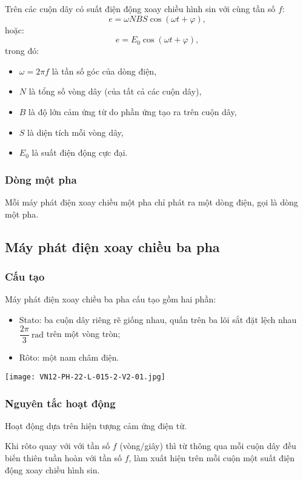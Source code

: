 Trên các cuộn dây có suất điện động xoay chiều hình sin với cùng tần số $f$:
\begin{equation*}
	e=\omega NBS\cos(\omega t +\varphi),
\end{equation*}
hoặc:
\begin{equation*}
	e=E_0\cos(\omega t +\varphi),
\end{equation*}
trong đó:
\begin{itemize}
	\item $\omega=2\pi f$ là tần số góc của dòng điện,
	\item $N$ là tổng số vòng dây (của tất cả các cuộn dây),
	\item $B$ là độ lớn cảm ứng từ do phần ứng tạo ra trên cuộn dây,	
	\item $S$ là diện tích mỗi vòng dây,
	\item $E_0$ là suất điện động cực đại.
\end{itemize}



\subsubsection{Dòng một pha}
Mỗi máy phát điện xoay chiều một pha chỉ phát ra một dòng điện, gọi là dòng một pha.
\subsection{Máy phát điện xoay chiều ba pha}
\subsubsection{Cấu tạo}
Máy phát điện xoay chiều ba pha cấu tạo gồm hai phần:			
\begin{itemize}
	\item Stato: ba cuộn dây riêng rẽ giống nhau, quấn trên ba lõi sắt đặt lệch nhau $\dfrac{2\pi}{3}\ \text{rad}$ trên một vòng tròn; 
	\item Rôto: một nam châm điện.
\end{itemize}
\begin{center}
	\texttt{[image: VN12-PH-22-L-015-2-V2-01.jpg]}
\end{center}
\subsubsection{Nguyên tắc hoạt động }
Hoạt động dựa trên hiện tượng cảm ứng điện từ.

Khi rôto quay với với tần số $f$ (vòng/giây) thì từ thông qua mỗi cuộn dây đều biến thiên tuần hoàn với tần số $f$, làm xuất hiện trên mỗi cuộn một suất điện động xoay chiều hình sin.

